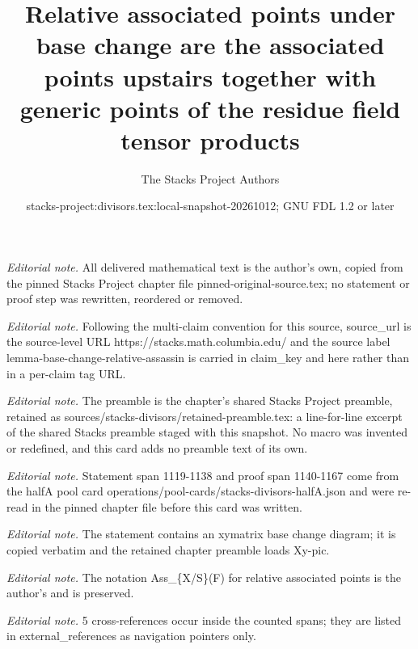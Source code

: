 \documentclass[10pt,a4paper]{amsart}
\title{Relative associated points under base change are the associated points upstairs together with generic points of the residue field tensor products}
\author{The Stacks Project Authors}
\date{stacks-project:divisors.tex:local-snapshot-20261012; GNU FDL 1.2 or later}
\theoremstyle{plain}
\theoremstyle{definition}
\theoremstyle{remark}
\numberwithin{equation}{subsection}
\begin{document}
\maketitle
\noindent\textit{Editorial note.} All delivered mathematical text is the author's own, copied from the pinned Stacks Project chapter file pinned-original-source.tex; no statement or proof step was rewritten, reordered or removed.\par\medskip
\noindent\textit{Editorial note.} Following the multi-claim convention for this source, source\_url is the source-level URL https://stacks.math.columbia.edu/ and the source label lemma-base-change-relative-assassin is carried in claim\_key and here rather than in a per-claim tag URL.\par\medskip
\noindent\textit{Editorial note.} The preamble is the chapter's shared Stacks Project preamble, retained as sources/stacks-divisors/retained-preamble.tex: a line-for-line excerpt of the shared Stacks preamble staged with this snapshot. No macro was invented or redefined, and this card adds no preamble text of its own.\par\medskip
\noindent\textit{Editorial note.} Statement span 1119-1138 and proof span 1140-1167 come from the halfA pool card operations/pool-cards/stacks-divisors-halfA.json and were re-read in the pinned chapter file before this card was written.\par\medskip
\noindent\textit{Editorial note.} The statement contains an xymatrix base change diagram; it is copied verbatim and the retained chapter preamble loads Xy-pic.\par\medskip
\noindent\textit{Editorial note.} The notation Ass\_\{X/S\}(F) for relative associated points is the author's and is preserved.\par\medskip
\noindent\textit{Editorial note.} 5 cross-references occur inside the counted spans; they are listed in external\_references as navigation pointers only.\par\medskip
\end{document}
